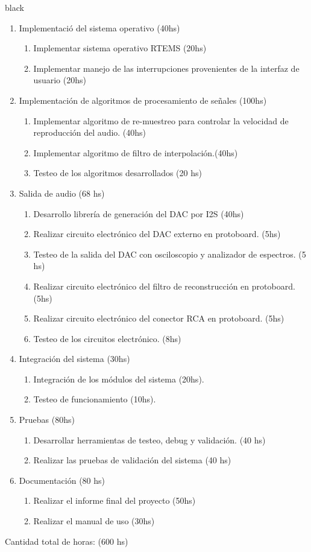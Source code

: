\documentclass[11pt]{charter}
\begin{document}
\begin{consigna}{black}
\begin{enumerate}
\begin{enumerate}
	\end{enumerate}
\item Implementació del sistema operativo (40hs)
	\begin{enumerate}
	\item Implementar sistema operativo RTEMS (20hs)
	\item Implementar manejo de las interrupciones provenientes de la interfaz de usuario (20hs) 
	\end{enumerate}
\item Implementación de algoritmos de procesamiento de señales (100hs)
	\begin{enumerate}
	\item Implementar algoritmo de re-muestreo para controlar la velocidad de reproducción del audio. (40hs)
	\item Implementar algoritmo de filtro de interpolación.(40hs)
	\item Testeo de los algoritmos desarrollados (20 hs)
	\end{enumerate}
\item Salida de audio (68 hs)
	\begin{enumerate}
	\item Desarrollo librería de generación del DAC por I2S (40hs)
	\item Realizar circuito electrónico del DAC externo en protoboard. (5hs)
	\item Testeo de la salida del DAC con osciloscopio y analizador de espectros. (5 hs)
	\item Realizar circuito electrónico del filtro de reconstrucción en protoboard. (5hs)
	\item Realizar circuito electrónico del conector RCA en protoboard. (5hs)
	\item Testeo de los circuitos electrónico. (8hs)
	\end{enumerate}
\item Integración del sistema (30hs)
	\begin{enumerate}
	\item Integración de los módulos del sistema (20hs).
	\item Testeo de funcionamiento (10hs).
	\end{enumerate}
\item Pruebas (80hs)
	\begin{enumerate}
	\item Desarrollar herramientas de testeo, debug y validación. (40 hs)
	\item Realizar las pruebas de validación del sistema (40 hs)
	\end{enumerate}
\item Documentación (80 hs)
	\begin{enumerate}
	\item Realizar el informe final del proyecto (50hs)
	\item Realizar el manual de uso (30hs)
	\end{enumerate}
\end{enumerate}

Cantidad total de horas: (600 hs)

\end{consigna}
\end{document}
